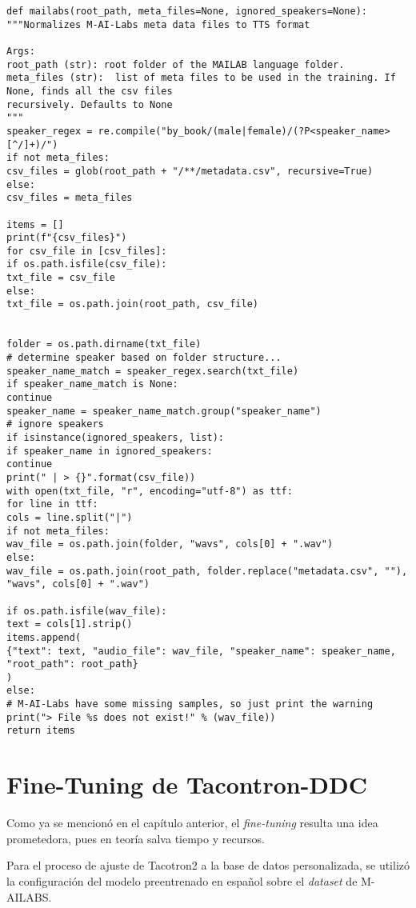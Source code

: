 \lstset{language=Python}
\lstset{frame=lines}
\lstset{basicstyle=\footnotesize}
\begin{lstlisting}
def mailabs(root_path, meta_files=None, ignored_speakers=None):
"""Normalizes M-AI-Labs meta data files to TTS format

Args:
root_path (str): root folder of the MAILAB language folder.
meta_files (str):  list of meta files to be used in the training. If None, finds all the csv files
recursively. Defaults to None
"""
speaker_regex = re.compile("by_book/(male|female)/(?P<speaker_name>[^/]+)/")
if not meta_files:
csv_files = glob(root_path + "/**/metadata.csv", recursive=True)
else:
csv_files = meta_files

items = []
print(f"{csv_files}")
for csv_file in [csv_files]:
if os.path.isfile(csv_file):
txt_file = csv_file
else:
txt_file = os.path.join(root_path, csv_file)


folder = os.path.dirname(txt_file)
# determine speaker based on folder structure...
speaker_name_match = speaker_regex.search(txt_file)
if speaker_name_match is None:
continue
speaker_name = speaker_name_match.group("speaker_name")
# ignore speakers
if isinstance(ignored_speakers, list):
if speaker_name in ignored_speakers:
continue
print(" | > {}".format(csv_file))
with open(txt_file, "r", encoding="utf-8") as ttf:
for line in ttf:
cols = line.split("|")
if not meta_files:
wav_file = os.path.join(folder, "wavs", cols[0] + ".wav")
else:
wav_file = os.path.join(root_path, folder.replace("metadata.csv", ""), "wavs", cols[0] + ".wav")

if os.path.isfile(wav_file):
text = cols[1].strip()
items.append(
{"text": text, "audio_file": wav_file, "speaker_name": speaker_name, "root_path": root_path}
)
else:
# M-AI-Labs have some missing samples, so just print the warning
print("> File %s does not exist!" % (wav_file))
return items
\end{lstlisting}

\section{Fine-Tuning de Tacontron-DDC}
Como ya se mencionó en el capítulo anterior, el \textit{fine-tuning} resulta una idea prometedora, pues en teoría salva tiempo y recursos.

Para el proceso de ajuste de Tacotron2 a la base de datos personalizada, se utilizó la configuración del modelo preentrenado en español sobre el \textit{dataset} de M-AILABS. 

